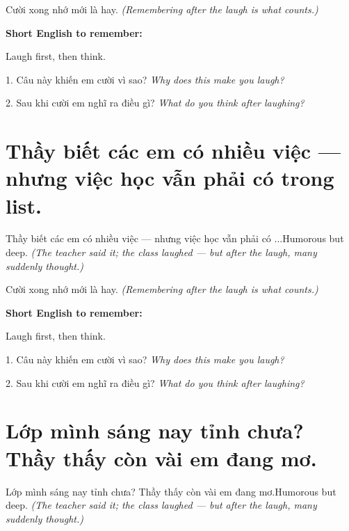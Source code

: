 \begin{baihoc}
Cười xong nhớ mới là hay.
\textit{(Remembering after the laugh is what counts.)}
\end{baihoc}

\begin{ghinhoanh}
\textbf{Short English to remember:}

Laugh first, then think.

\end{ghinhoanh}

\begin{tuhocnhanh}
1. Câu này khiến em cười vì sao? \textit{Why does this make you laugh?}

2. Sau khi cười em nghĩ ra điều gì? \textit{What do you think after laughing?}
\end{tuhocnhanh}
\ngancach


\section{Thầy biết các em có nhiều việc — nhưng việc học vẫn phải có trong list.}
\begin{truyen}{Thầy biết các em có nhiều việc — nhưng việc học vẫn phải có ...}{Humorous but deep.}
\textit{(The teacher said it; the class laughed — but after the laugh, many suddenly thought.)}
\end{truyen}

\begin{baihoc}
Cười xong nhớ mới là hay.
\textit{(Remembering after the laugh is what counts.)}
\end{baihoc}

\begin{ghinhoanh}
\textbf{Short English to remember:}

Laugh first, then think.

\end{ghinhoanh}

\begin{tuhocnhanh}
1. Câu này khiến em cười vì sao? \textit{Why does this make you laugh?}

2. Sau khi cười em nghĩ ra điều gì? \textit{What do you think after laughing?}
\end{tuhocnhanh}
\ngancach


\section{Lớp mình sáng nay tỉnh chưa? Thầy thấy còn vài em đang mơ.}
\begin{truyen}{Lớp mình sáng nay tỉnh chưa? Thầy thấy còn vài em đang mơ.}{Humorous but deep.}
\textit{(The teacher said it; the class laughed — but after the laugh, many suddenly thought.)}
\end{truyen}


